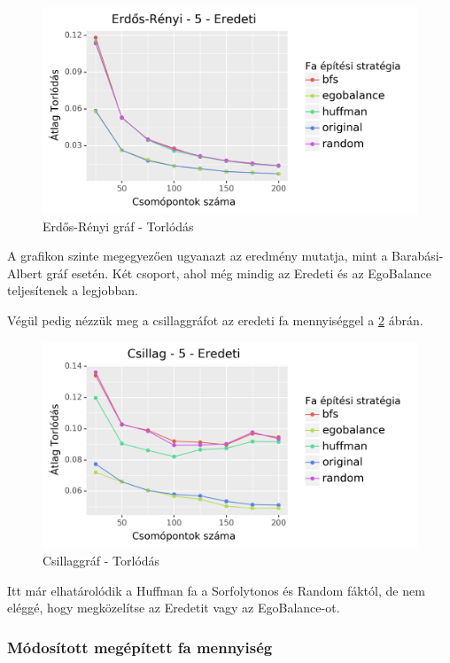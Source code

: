 \documentclass[12pt]{report}
\begin{document}
\begin{figure}[H]
	\begin{center}
		\includegraphics[width=0.9\linewidth]{pictures/erdos_con_e.png}
		\caption{Erdős-Rényi gráf - Torlódás}
		\label{erdos-con}
	\end{center}
\end{figure}

A grafikon szinte megegyezően ugyanazt az eredmény mutatja, mint a Barabási-Albert gráf esetén.
Két csoport, ahol még mindig az Eredeti és az EgoBalance teljesítenek a legjobban.

Végül pedig nézzük meg a csillaggráfot az eredeti fa mennyiséggel a \ref{star-con} ábrán.

\begin{figure}[H]
	\begin{center}
		\includegraphics[width=0.9\linewidth]{pictures/star_con_e.png}
		\caption{Csillaggráf - Torlódás}
		\label{star-con}
	\end{center}
\end{figure}

Itt már elhatárolódik a Huffman fa a Sorfolytonos és Random fáktól, de nem eléggé, hogy megközelítse az Eredetit vagy az EgoBalance-ot.

\subsubsection{Módosított megépített fa mennyiség}
\end{document}
